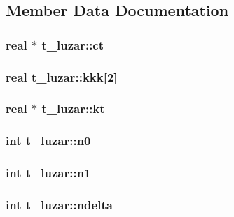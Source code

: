 \subsection{\-Member \-Data \-Documentation}
\hypertarget{structt__luzar_a07e593b6b8012ce0de2988d27e1870cf}{
\subsubsection[{ct}]{\setlength{\rightskip}{0pt plus 5cm}real $\ast$ {\bf t\-\_\-luzar\-::ct}}}\label{structt__luzar_a07e593b6b8012ce0de2988d27e1870cf}
\hypertarget{structt__luzar_ab4615e40a681113ac0a6294706158e7b}{
\subsubsection[{kkk}]{\setlength{\rightskip}{0pt plus 5cm}real {\bf t\-\_\-luzar\-::kkk}\mbox{[}2\mbox{]}}}\label{structt__luzar_ab4615e40a681113ac0a6294706158e7b}
\hypertarget{structt__luzar_aeacceb1a346575e3587f4e7f547ee2a3}{
\subsubsection[{kt}]{\setlength{\rightskip}{0pt plus 5cm}real $\ast$ {\bf t\-\_\-luzar\-::kt}}}\label{structt__luzar_aeacceb1a346575e3587f4e7f547ee2a3}
\hypertarget{structt__luzar_a643e679f7382670865eb62119fa6fa87}{
\subsubsection[{n0}]{\setlength{\rightskip}{0pt plus 5cm}int {\bf t\-\_\-luzar\-::n0}}}\label{structt__luzar_a643e679f7382670865eb62119fa6fa87}
\hypertarget{structt__luzar_a9475536964b665804ab06f08d6ef5610}{
\subsubsection[{n1}]{\setlength{\rightskip}{0pt plus 5cm}int {\bf t\-\_\-luzar\-::n1}}}\label{structt__luzar_a9475536964b665804ab06f08d6ef5610}
\hypertarget{structt__luzar_a0bc1cb5d9e804b61a940e9c68bfa10ab}{
\subsubsection[{ndelta}]{\setlength{\rightskip}{0pt plus 5cm}int {\bf t\-\_\-luzar\-::ndelta}}}\label{structt__luzar_a0bc1cb5d9e804b61a940e9c68bfa10ab}
